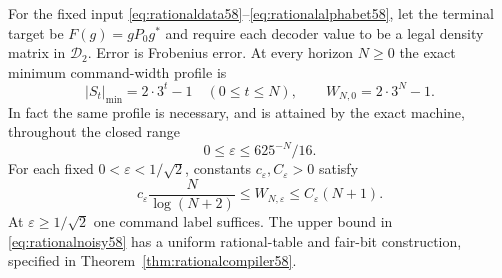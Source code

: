\begin{theorem}
\label{thm:rationalseparation58}
For the fixed input \eqref{eq:rationaldata58}--\eqref{eq:rationalalphabet58},
let the terminal target be $F(g)=gP_0g^*$ and require each decoder value
to be a legal density matrix in $\mathcal D_2$. Error is Frobenius error.
At every horizon $N\ge0$ the exact minimum command-width profile is
\begin{equation}\label{eq:rationalprofile58}
             |S_t|_{\min}=2\cdot3^t-1\quad(0\le t\le N),
       \qquad W_{N,0}=2\cdot3^N-1.
\end{equation}
In fact the same profile is necessary, and is attained by the exact
machine, throughout the closed range
\begin{equation}\label{eq:robustendpoint58}
                      0\le\varepsilon\le625^{-N}/16.
\end{equation}
For each fixed $0<\varepsilon<1/\sqrt2$, constants $c_\varepsilon,
C_\varepsilon>0$ satisfy
\begin{equation}\label{eq:rationalnoisy58}
 c_\varepsilon\frac{N}{\log(N+2)}
       \le W_{N,\varepsilon}\le C_\varepsilon(N+1).
\end{equation}
At $\varepsilon\ge1/\sqrt2$ one command label suffices. The upper bound
in \eqref{eq:rationalnoisy58} has a uniform rational-table and fair-bit
construction, specified in Theorem~\ref{thm:rationalcompiler58}.
\end{theorem}
